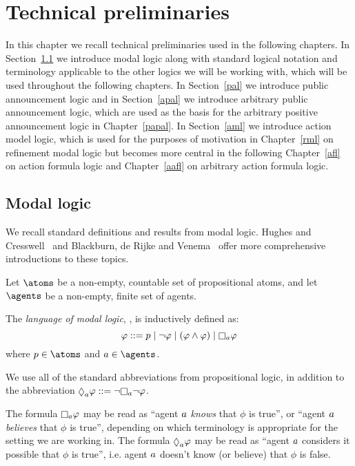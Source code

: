 \chapter{Technical preliminaries}\label{technical}

In this chapter we recall technical preliminaries used in the following chapters.
In Section~\ref{ml} we introduce modal logic along with standard logical notation and terminology applicable to the other logics we will be working with, which will be used throughout the following chapters.
In Section~\ref{pal} we introduce public announcement logic and in Section~\ref{apal} we introduce arbitrary public announcement logic, which are used as the basis for the arbitrary positive announcement logic in Chapter~\ref{papal}.
In Section~\ref{aml} we introduce action model logic, which is used for the purposes of motivation in Chapter~\ref{rml} on refinement modal logic but becomes more central in the following Chapter~\ref{afl} on action formula logic and Chapter~\ref{aafl} on arbitrary action formula logic.

\section{Modal logic}\label{ml}

We recall standard definitions and results from modal logic.
Hughes and Cresswell~\cite{hughesetal:1996} and Blackburn, de Rijke and Venema~\cite{blackburnetal:2001} offer more comprehensive introductions to these topics.

Let $\atoms$ be a non-empty, countable set of propositional atoms, and
let $\agents$ be a non-empty, finite set of agents.

\begin{definition}
The {\em language of modal logic}, \langMl{}, is inductively defined as:
$$
\phi ::= 
    \atomP \mid
    \lnot \phi \mid
    (\phi \land \phi) \mid
    \necessaryA \phi
$$
where $\atomP \in \atoms$ and $\agentA \in \agents$.
\end{definition}

We use all of the standard abbreviations from propositional logic, in addition to the abbreviation $\possibleA \phi ::= \lnot \necessaryA \lnot \phi$.

The formula $\necessaryA \phi$ may be read as ``agent $a$ {\em knows} that $\phi$ is true'', or ``agent $a$ {\em believes} that $\phi$ is true'', depending on which terminology is appropriate for the setting we are working in.
The formula $\possibleA \phi$ may be read as ``agent $a$ considers it possible that $\phi$ is true'', i.e. agent $a$ doesn't know (or believe) that $\phi$ is false.


